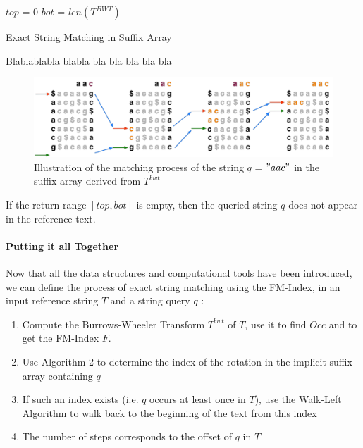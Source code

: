 \begin{minipage}[t]{0.55\textwidth}
\begin{algorithm}[H]
\SetAlgoLined
{}
	$top$ = 0\;
	$bot$ = $len(T^{BWT})$\;
\caption{Exact String Matching in Suffix Array}
\end{algorithm}
\end{minipage}
\hspace{3mm}
\begin{minipage}[t]{0.3\textwidth}
Blablablabla blabla bla bla bla bla bla
\end{minipage}

\begin{figure}[H]
\centering
\includegraphics[scale = 0.35]{Figures/matching_algo.png}
\caption{Illustration of the matching process of the string  $q$ = $"aac"$ in the suffix array derived from $T^{bwt}$ }
\end{figure}


If the return range $[top, bot]$ is empty, then the queried string $q$ does not appear in the reference text.


\paragraph{Putting it all Together}

Now that all the data structures and computational tools have been introduced, we can define the process of exact string matching using the FM-Index, in an input reference string $T$ and a string query $q$ :
\begin{enumerate}
\item Compute the Burrows-Wheeler Transform $T^{bwt}$ of $T$, use it to find $Occ$ and to get the FM-Index $F$.
\item Use Algorithm 2 to determine the index of the rotation in the implicit suffix array containing $q$
\item If such an index exists (i.e. $q$ occurs at least once in $T$), use the Walk-Left Algorithm to walk back to the beginning of the text from this index
\item The number of steps corresponds to the offset of $q$ in $T$
\end{enumerate}

